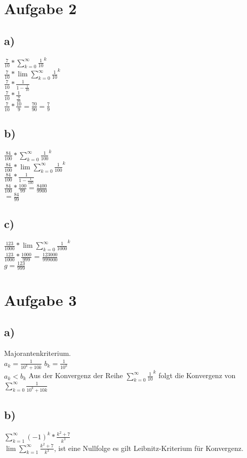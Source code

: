 \documentclass{article}
\begin{document}
	\section*{Aufgabe 2}
	\subsection*{a)}
	$\frac{7}{10}* \sum\limits_{k=0}^{\infty}\frac{1}{10}^{k}$ \\
	$\frac{7}{10}* \lim\sum\limits_{k=0}^{\infty}\frac{1}{10}^{k}$ \\
	$\frac{7}{10}* \frac{1}{1 - \frac{1}{10}}$ \\
	$\frac{7}{10}* \frac{1}{\frac{9}{10}}$ \\
	$\frac{7}{10}* \frac{10}{9}= \frac{70}{90} = \frac{7}{9} $
	\subsection*{b)}
	$\frac{84}{100} * \sum\limits_{k=0}^{\infty} \frac{1}{100}^{k}$ \\
	$\frac{84}{100} * \lim\sum\limits_{k=0}^{\infty} \frac{1}{100}^{k}$ \\
	$\frac{84}{100} * \frac{1}{1 - \frac{1}{100}}$ \\
	$\frac{84}{100} * \frac{100}{99} = \frac{8400}{9900}$ \\
	$= \frac{84}{99}$
	\subsection*{c)}
	$\frac{123}{1000} * \lim\sum\limits_{k=0}^{\infty} \frac{1}{1000}^{k}$ \\
	$\frac{123}{1000} * \frac{1000}{999}$ = $\frac{123000}{999000}$ \\
	$g = \frac{123}{999}$
	\section*{Aufgabe 3}
	\subsection*{a)}
	Majorantenkriterium. \\
	$a_{k} = \frac{1}{10^{k} + 10k}$ $b_k = \frac{1}{10^{k}}$ \\
	$a_{k} < b_{k}$
	Aus der Konvergenz der Reihe $\sum\limits_{k=0}^{\infty} \frac{1}{10}^{k}$ folgt die Konvergenz von $\sum\limits_{k=0}^{\infty}\frac{1}{10^{k} + 10k}$
	\subsection*{b)}
	$\sum\limits_{k=1}^{\infty}(-1)^{k}*\frac{k^2+ 7}{k^3}$ \\
	$\lim\sum\limits_{k=1}^{\infty} \frac{k^2+ 7}{k^3}$, ist eine Nullfolge es gilt Leibnitz-Kriterium für Konvergenz.
\end{document}
